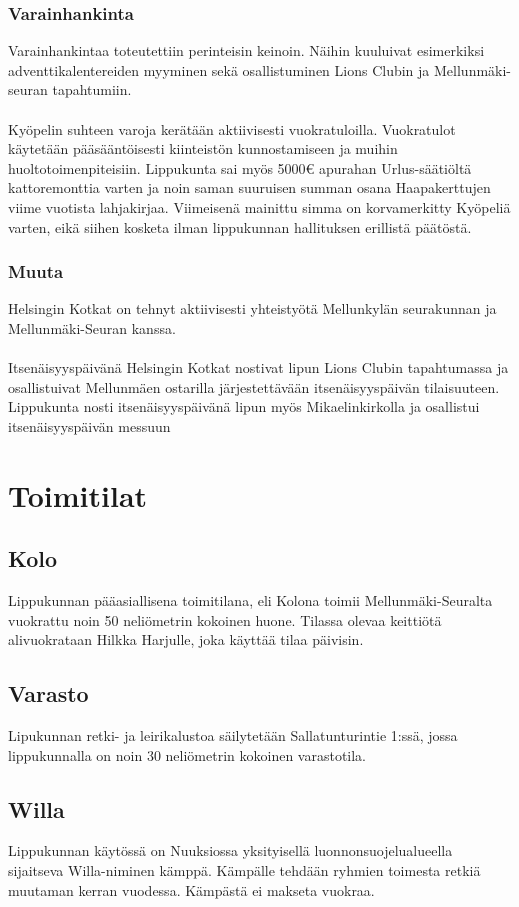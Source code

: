 \documentclass[a4paper, 12pt, finnish]{report} %
\begin{document}
\subsubsection{Varainhankinta}
Varainhankintaa toteutettiin perinteisin keinoin. Näihin kuuluivat esimerkiksi adventtikalentereiden myyminen sekä osallistuminen Lions Clubin ja Mellunmäki-seuran tapahtumiin.\\
\\Kyöpelin suhteen varoja kerätään aktiivisesti vuokratuloilla. Vuokratulot käytetään pääsääntöisesti kiinteistön kunnostamiseen ja muihin huoltotoimenpiteisiin. Lippukunta sai myös 5000\euro{} apurahan Urlus-säätiöltä kattoremonttia varten ja noin saman suuruisen summan osana Haapakerttujen viime vuotista lahjakirjaa. Viimeisenä mainittu simma on korvamerkitty Kyöpeliä varten, eikä siihen kosketa ilman lippukunnan hallituksen erillistä päätöstä.
\subsubsection{Muuta}
Helsingin Kotkat on tehnyt aktiivisesti yhteistyötä Mellunkylän seurakunnan ja Mellunmäki-Seuran kanssa.\\ 
\\Itsenäisyyspäivänä Helsingin Kotkat nostivat lipun Lions Clubin tapahtumassa ja osallistuivat Mellunmäen ostarilla järjestettävään itsenäisyyspäivän tilaisuuteen. Lippukunta nosti itsenäisyyspäivänä lipun myös Mikaelinkirkolla ja osallistui itsenäisyyspäivän messuun
\newpage
\section{Toimitilat}
\subsection{Kolo}
Lippukunnan pääasiallisena toimitilana, eli Kolona toimii Mellunmäki-Seuralta vuokrattu noin 50 neliömetrin kokoinen huone. Tilassa olevaa keittiötä alivuokrataan Hilkka Harjulle, joka käyttää tilaa päivisin.
\subsection{Varasto}
Lipukunnan retki- ja leirikalustoa säilytetään Sallatunturintie 1:ssä, jossa lippukunnalla on noin 30 neliömetrin kokoinen varastotila. 
\subsection{Willa}
Lippukunnan käytössä on Nuuksiossa yksityisellä luonnonsuojelualueella sijaitseva Willa-niminen kämppä. Kämpälle tehdään ryhmien toimesta retkiä muutaman kerran vuodessa. Kämpästä ei makseta vuokraa.
\end{document}
